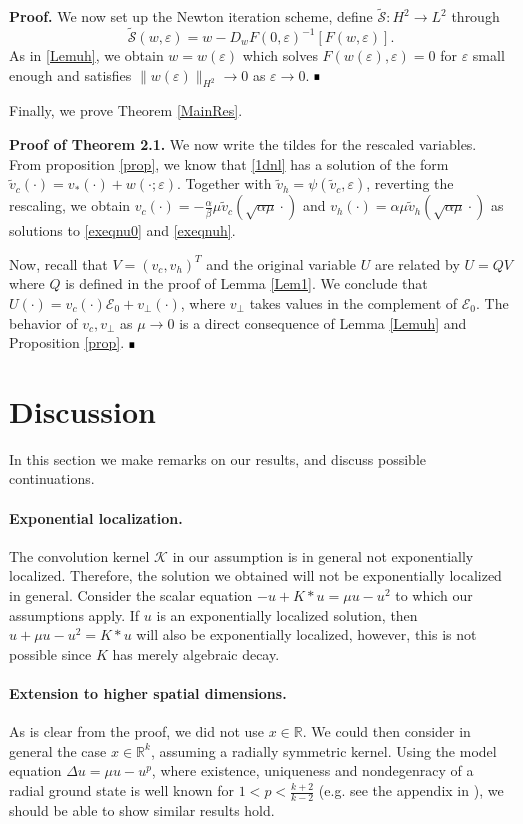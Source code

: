 \documentclass[letterpaper,11pt]{article}
\newcommand{\R}{\mathbb{R}}
\newcommand{\eps}{\varepsilon}
\newcommand{\K}{\mathcal{K}}
\newcommand{\cS}{\mathcal{S}}
\numberwithin{equation}{section}
\theoremstyle{plain}
\theoremstyle{remark}
\newenvironment{Proof}[1][.]%
 {\begin{trivlist}\item[]\textbf{Proof#1 }}%
 {\hspace*{\fill}$\rule{0.3\baselineskip}{0.35\baselineskip}$\end{trivlist}}
\begin{document}
\begin{Proof}
We now set up the Newton iteration scheme, define $\tilde{\cS}: H^2 \to L^2$ through
\[\tilde{\cS}(w,\eps) = w-D_wF(0,\eps)^{-1}[F(w,\eps)].\]
As in \ref{Lemuh}, we obtain $w=w(\eps)$ which solves $F(w(\eps),\eps) = 0$ for $\eps $ small enough and satisfies $\|w(\eps)\|_{H^2} \to 0$ as $\eps \to 0$.
\end{Proof}

Finally, we prove Theorem \ref{MainRes}.
\begin{Proof}[ of Theorem 2.1.] We now write the tildes for the rescaled variables. From proposition \ref{prop}, we know that \eqref{1dnl} has a solution of the form $\tilde{v}_c(\cdot) = v_*(\cdot)+w(\cdot;\eps)$. Together with $\tilde{v}_h = \psi(\tilde{v}_c,\eps)$, reverting the rescaling, we obtain $v_c(\cdot) = -\frac{\alpha}{\beta}\mu \tilde{v}_c(\sqrt{\alpha\mu }\cdot)$ and $v_h(\cdot) = \alpha\mu \tilde{v}_h(\sqrt{\alpha\mu}\cdot)$ as solutions to \eqref{exeqnu0} and \eqref{exeqnuh}.

 Now, recall that $V=(v_c,v_h)^T$ and the original variable $U$ are related by $U= QV$ where $Q$ is defined in the proof of Lemma \ref{Lem1}. We conclude that $U(\cdot)=v_c(\cdot)\mathcal{E}_0+v_{\perp}(\cdot)$, where $v_{\perp}$ takes values in the complement of $\mathcal{E}_0$. The behavior of $v_c,v_{\perp}$ as $\mu \to 0$ is a direct consequence of Lemma \ref{Lemuh} and Proposition \ref{prop}.
\end{Proof}
\section{Discussion}
In this section we make remarks on our results, and discuss possible continuations.
\paragraph{Exponential localization.}
The convolution kernel $\K$ in our assumption is in general not exponentially localized. Therefore, the solution we obtained will not be exponentially localized in general. Consider the scalar equation $-u+K\ast u=\mu u -u^2$ to which our assumptions apply. If $u$ is an exponentially localized solution, then $u+\mu u-u^2 = K\ast u$ will also be exponentially localized, however, this is not possible since $K$ has merely algebraic decay.

\paragraph{Extension to higher spatial dimensions.}
As is clear from the proof, we did not use $ x\in \R$. We could then consider in general the case $x\in \R^k$, assuming a radially symmetric kernel. Using the model equation $\Delta u = \mu u -u^p$, where existence, uniqueness and nondegenracy of a radial ground state is well known for $1<p<\frac{k+2}{k-2}$ (e.g. see the appendix in \cite{wei2013mathematical}), we should be able to show similar results hold. 
\end{document}
